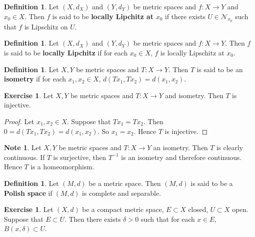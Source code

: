 \documentclass[12pt]{amsart}
\theoremstyle{definition}
\newtheorem{defn}[definition]{Definition}
\newtheorem{note}[definition]{Note}
\newtheorem{ex}[definition]{Exercise}
\newcommand{\del}{\delta}
\newcommand{\MN}{\mathcal{N}}
\newcommand{\tbf}[1]{\textbf{#1}}
\DeclareMathOperator*{\0}{\mbf{0}}
\DeclareMathOperator*{\1}{\mbf{1}}
\newcommand{\lex}[1]{\label{ex:#1}}
\newcommand{\ld}[1]{\label{defn:#1}}
\begin{document}
	\begin{defn} \ld{}
	Let $(X, d_X)$ and $(Y, d_Y)$ be metric spaces and $f: X \rightarrow Y$ and $x_0 \in X$. Then $f$ is said to be \tbf{locally Lipchitz at $x_0$} if there exists $U \in \MN_{x_0}$ such that $f$ is Lipschitz on $U$.
	\end{defn}
	
	\begin{defn} \ld{}
	Let $(X, d_X)$ and $(Y, d_Y)$ be metric spaces and $f: X \rightarrow Y$. Then $f$ is said to be \tbf{locally Lipchitz} if for each $x_0 \in X$, $f$ is locally Lipschitz at $x_0$.
	\end{defn}
	
	
	\begin{defn} \ld{}
		Let $X, Y$ be metric spaces and $T : X \rightarrow Y$. Then $T$ is said to be an \tbf{isometry} if for each $x_1, x_2 \in X$, $d( Tx_1, Tx_2) = d(x_1,x_2) $.
	\end{defn}
	
	\begin{ex} \lex{}
		Let $X,Y$ be metric spaces and $T:X \rightarrow Y$ and isometry. Then $T$ is injective.
	\end{ex}
	
	\begin{proof}
		Let $x_1, x_2 \in X$. Suppose that $Tx_1=Tx_2$. Then $0= d( Tx_1, Tx_2) = d(x_1,x_2)$. So $x_1 = x_2$. Hence $T$ is injective.
	\end{proof}
	
	\begin{note}
		Let $X,Y$ be metric spaces and $T:X \rightarrow Y$ an isometry. Then $T$ is clearly continuous. If $T$ is surjective, then $T^{-1}$ is an isometry and therefore continuous. Hence $T$ is a homeomorphism.
	\end{note}
	
	\begin{defn} \ld{}
	Let $(M,d)$ be a metric space. Then $(M,d)$ is said to be a \tbf{Polish space} if $(M,d)$ is complete and separable. 
	\end{defn}
	
	
	
	\begin{ex} \lex{}
	Let $(X, d)$ be a compact metric space, $E \subset X$ closed, $U \subset X$ open. Suppose that $E \subset U$. Then there exists $\del >0$ such that for each $x \in E$, $B(x, \del) \subset U$.
	\end{ex}	
	
\end{document}
